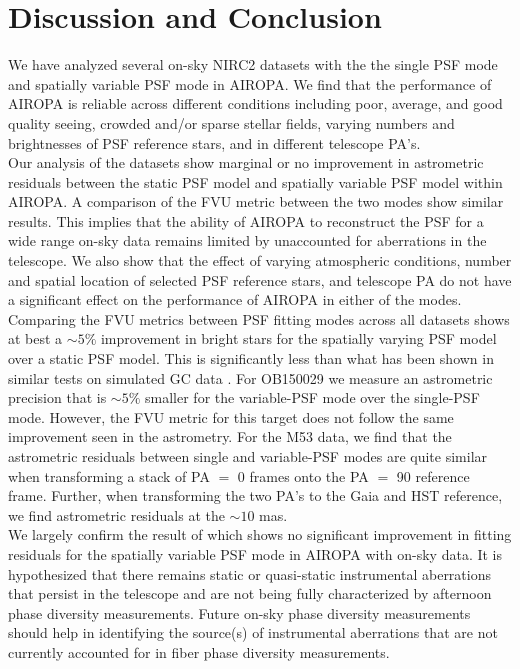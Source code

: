 \documentclass[]{spie}  %
\begin{document}
\section{Discussion and Conclusion} \label{sec:conclusion}

\indent We have analyzed several on-sky NIRC2 datasets with the the single PSF mode and spatially variable PSF mode in AIROPA. We find that the performance of AIROPA is reliable across different conditions including poor, average, and good quality seeing, crowded and/or sparse stellar fields, varying numbers and brightnesses of PSF reference stars, and in different telescope PA's.
\\
\indent Our analysis of the datasets show marginal or no improvement in astrometric residuals between the static PSF model and spatially variable PSF model within AIROPA. A comparison of the FVU metric between the two modes show similar results. This implies that the ability of AIROPA to reconstruct the PSF for a wide range on-sky data remains limited by unaccounted for aberrations in the telescope. We also show that the effect of varying atmospheric conditions, number and spatial location of selected PSF reference stars, and telescope PA do not have a significant effect on the performance of AIROPA in either of the modes.
\\
\indent Comparing the FVU metrics between PSF fitting modes across all datasets shows at best a ${\sim}5\%$ improvement in bright stars for the spatially varying PSF model over a static PSF model. This is significantly less than what has been shown in similar tests on simulated GC data \cite{Turri:inprep}. For OB150029 we measure an astrometric precision that is ${\sim}5\%$ smaller for the variable-PSF mode over the single-PSF mode. However, the FVU metric for this target does not follow the same improvement seen in the astrometry. For the M53 data, we find that the astrometric residuals between single and variable-PSF modes are quite similar when transforming a stack of PA $=$ 0 frames onto the PA $=$ 90 reference frame. Further, when transforming the two PA's to the Gaia and HST reference, we find astrometric residuals at the $\sim 10$ mas.
\\
\indent We largely confirm the result of \cite{Turri:inprep} which shows no significant improvement in fitting residuals for the spatially variable PSF mode in AIROPA with on-sky data. It is hypothesized that there remains static or quasi-static instrumental aberrations that persist in the telescope and are not being fully characterized by afternoon phase diversity measurements. Future on-sky phase diversity measurements should help in identifying the source(s) of instrumental aberrations that are not currently accounted for in fiber phase diversity measurements. 
\end{document}
